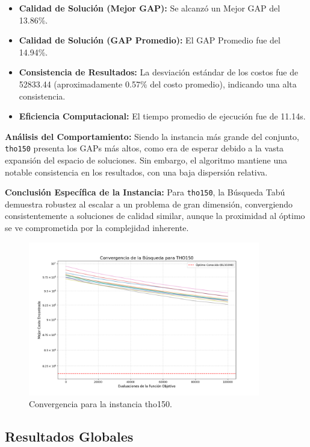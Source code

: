 \documentclass[12pt, a4paper]{article}
\begin{document}
\begin{itemize}
    \item \textbf{Calidad de Solución (Mejor GAP):} Se alcanzó un Mejor GAP del 13.86\%.
    \item \textbf{Calidad de Solución (GAP Promedio):} El GAP Promedio fue del 14.94\%.
    \item \textbf{Consistencia de Resultados:} La desviación estándar de los costos fue de 52833.44 (aproximadamente 0.57\% del costo promedio), indicando una alta consistencia.
    \item \textbf{Eficiencia Computacional:} El tiempo promedio de ejecución fue de 11.14s.
\end{itemize}

\textbf{Análisis del Comportamiento:}
Siendo la instancia más grande del conjunto, \texttt{tho150} presenta los GAPs más altos, como era de esperar debido a la vasta expansión del espacio de soluciones. Sin embargo, el algoritmo mantiene una notable consistencia en los resultados, con una baja dispersión relativa.

\textbf{Conclusión Específica de la Instancia:}
Para \texttt{tho150}, la Búsqueda Tabú demuestra robustez al escalar a un problema de gran dimensión, convergiendo consistentemente a soluciones de calidad similar, aunque la proximidad al óptimo se ve comprometida por la complejidad inherente.
\begin{figure}[H]
\centering
\includegraphics[width=0.9\textwidth]{../results/graphs/tho150_convergence.png}
\caption{Convergencia para la instancia tho150.}
\label{fig:tho150_conv}
\end{figure}

\clearpage

\subsection{Resultados Globales}
\end{document}
